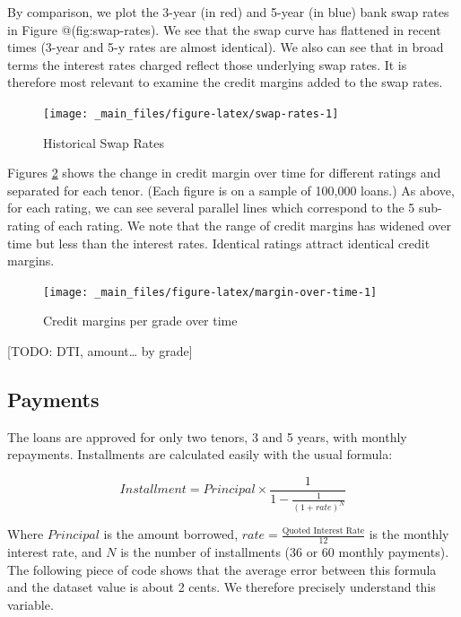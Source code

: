 \documentclass[11pt,]{report}
\begin{document}
By comparison, we plot the 3-year (in red) and 5-year (in blue) bank swap rates in Figure @(fig:swap-rates). We see that the swap curve has flattened in recent times (3-year and 5-y rates are almost identical). We also can see that in broad terms the interest rates charged reflect those underlying swap rates. It is therefore most relevant to examine the credit margins added to the swap rates.

\begin{figure}

{\centering \texttt{[image: \_main\_files/figure-latex/swap-rates-1]} 

}

\caption{Historical Swap Rates}\label{fig:swap-rates}
\end{figure}

Figures \ref{fig:margin-over-time} shows the change in credit margin over time for different ratings and separated for each tenor. (Each figure is on a sample of 100,000 loans.) As above, for each rating, we can see several parallel lines which correspond to the 5 sub-rating of each rating. We note that the range of credit margins has widened over time but less than the interest rates. Identical ratings attract identical credit margins.

\begin{figure}

{\centering \texttt{[image: \_main\_files/figure-latex/margin-over-time-1]} 

}

\caption{Credit margins per grade over time}\label{fig:margin-over-time}
\end{figure}

{[}TODO: DTI, amount\ldots{} by grade{]}

\hypertarget{payments}{%
\subsection{Payments}\label{payments}}

The loans are approved for only two tenors, 3 and 5 years, with monthly repayments. Installments are calculated easily with the usual formula:

\[
Installment = Principal \times \frac{1}{1 - \frac{1}{(1+rate)^N}}
\]

Where \(Principal\) is the amount borrowed, \(rate = \frac{\text{Quoted Interest Rate}}{12}\) is the monthly interest rate, and \(N\) is the number of installments (36 or 60 monthly payments). The following piece of code shows that the average error between this formula and the dataset value is about 2 cents. We therefore precisely understand this variable.
\end{document}
